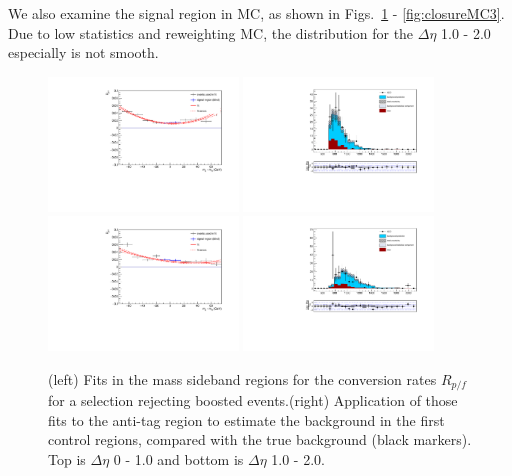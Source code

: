 We also examine the signal region in MC, as shown in Figs.~\ref{fig:closureMC1} - \ref{fig:closureMC3}. Due to low statistics and reweighting MC, the distribution for the $\Delta\eta$ 1.0 - 2.0 especially is not smooth.

\begin{figure}[h]
\centering
\includegraphics[width=0.45\textwidth]{F5/HH4b2p1SR_Fit_BG_boost_dEta0_MCSR.pdf}
\includegraphics[width=0.45\textwidth]{F5/HH4b2p1_Plot_BG_boost_dEta0_MCSR.pdf}\\
\includegraphics[width=0.45\textwidth]{F5/HH4b2p1SR_Fit_BG_boost_dEta1_MCSR.pdf}
\includegraphics[width=0.45\textwidth]{F5/HH4b2p1_Plot_BG_boost_dEta1_MCSR.pdf}
\caption{(left) Fits in the mass sideband regions for the conversion rates $R_{p/f}$ for a selection rejecting boosted events.(right) Application of those fits to the anti-tag region to estimate the background in the first control regions, compared with the true background (black markers). Top is $\Delta\eta$ 0 - 1.0 and bottom is $\Delta\eta$ 1.0 - 2.0.}
\label{fig:closureMC1}
\end{figure}

